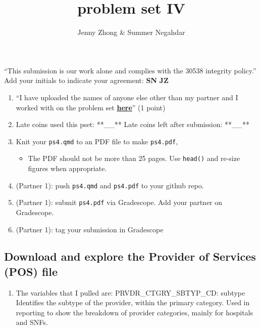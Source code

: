 \documentclass[
  letterpaper,
  DIV=11,
  numbers=noendperiod]{scrartcl}
\title{problem set IV}
\author{Jenny Zhong \& Summer Negahdar}
\date{}
\providecommand{\tightlist}{%
  \setlength{\itemsep}{0pt}\setlength{\parskip}{0pt}}\usepackage{longtable,booktabs,array}
\begin{document}
\maketitle



``This submission is our work alone and complies with the 30538
integrity policy.'' Add your initials to indicate your agreement:
\textbf{SN} \textbf{JZ}

\begin{enumerate}
\def\labelenumi{\arabic{enumi}.}
\setcounter{enumi}{4}
\tightlist
\item
  ``I have uploaded the names of anyone else other than my partner and I
  worked with on the problem set
  \textbf{\href{https://docs.google.com/forms/d/185usrCREQaUbvAXpWhChkjghdGgmAZXA3lPWpXLLsts/edit}{here}}''
  (1 point)
\item
  Late coins used this pset: **\_\_** Late coins left after submission:
  **\_\_**
\item
  Knit your \texttt{ps4.qmd} to an PDF file to make \texttt{ps4.pdf},

  \begin{itemize}
  \tightlist
  \item
    The PDF should not be more than 25 pages. Use \texttt{head()} and
    re-size figures when appropriate.
  \end{itemize}
\item
  (Partner 1): push \texttt{ps4.qmd} and \texttt{ps4.pdf} to your github
  repo.
\item
  (Partner 1): submit \texttt{ps4.pdf} via Gradescope. Add your partner
  on Gradescope.
\item
  (Partner 1): tag your submission in Gradescope
\end{enumerate}

\subsection{Download and explore the Provider of Services (POS)
file}\label{download-and-explore-the-provider-of-services-pos-file}

\begin{enumerate}
\def\labelenumi{\arabic{enumi}.}
\tightlist
\item
  The variables that I pulled are: PRVDR\_CTGRY\_SBTYP\_CD: subtype
  Identifies the subtype of the provider, within the primary category.
  Used in reporting to show the breakdown of provider categories, mainly
  for hospitals and SNFs.
\end{enumerate}
\end{document}
